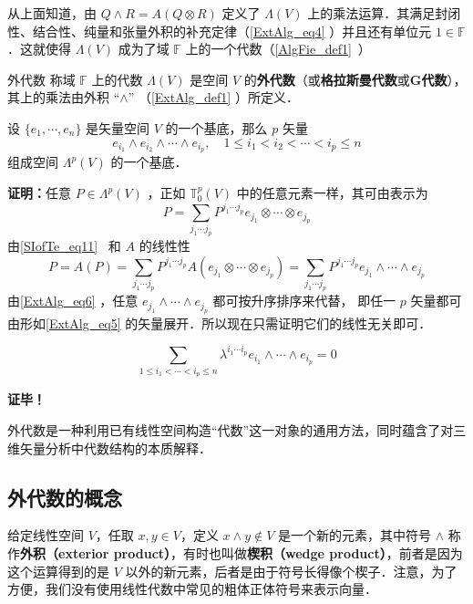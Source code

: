 从上面知道，由 $Q \wedge R=A(Q\otimes R)$ 定义了 $\Lambda(V)$ 上的乘法运算．其满足封闭性、结合性、纯量和张量外积的补充定律（\autoref{ExtAlg_eq4} ）并且还有单位元 $1\in\mathbb F$．这就使得 $\Lambda(V)$ 成为了域 $\mathbb F$ 上的一个代数（\autoref{AlgFie_def1}~）
\begin{definition}{外代数}
称域 $\mathbb F$ 上的代数 $\Lambda(V)$ 是空间 $V$ 的\textbf{外代数}（或\textbf{格拉斯曼代数}或\textbf{G代数}），其上的乘法由外积 “$\wedge$” （\autoref{ExtAlg_def1} ）所定义．
\end{definition}
\begin{theorem}{}
设 $\{e_1,\cdots,e_n\}$ 是矢量空间 $V$ 的一个基底，那么 $p$ 矢量
\begin{equation}\label{ExtAlg_eq5}
e_{i_1}\wedge e_{i_2}\wedge\cdots\wedge e_{i_p},\quad 1\leq i_1<i_2<\cdots<i_p\leq n
\end{equation}
组成空间 $\Lambda^p(V)$ 的一个基底．
\end{theorem}
\textbf{证明：}任意 $P\in\Lambda^p(V)$ ，正如 $\mathbb T_0^p(V)$ 中的任意元素一样，其可由表示为
\begin{equation}
P=\sum_{j_1\cdots j_p}P^{j_1\cdots j_p}e_{j_1}\otimes\cdots\otimes e_{j_p}
\end{equation}
由\autoref{SIofTe_eq11}~ 和 $A$ 的线性性
\begin{equation}
P=A(P)=\sum_{j_1\cdots j_p}P^{j_1\cdots j_p}A(e_{j_1}\otimes\cdots\otimes e_{j_p})=\sum_{j_1\cdots j_p}P^{j_1\cdots j_p}e_{j_1}\wedge\cdots\wedge e_{j_p}
\end{equation}
由\autoref{ExtAlg_eq6} ，任意 $e_{j_1}\wedge\cdots\wedge e_{j_p}$ 都可按升序排序来代替， 即任一 $p$ 矢量都可由形如\autoref{ExtAlg_eq5} 的矢量展开．所以现在只需证明它们的线性无关即可．


\begin{equation}
\sum_{1\leq i_1<\cdots<i_p\leq n} \lambda^{i_1\cdots i_p} e_{i_1}\wedge\cdots\wedge e_{i_p}=0
\end{equation}



\textbf{证毕！}



外代数是一种利用已有线性空间构造“代数”这一对象的通用方法，同时蕴含了对三维矢量分析中代数结构的本质解释．

\subsection{外代数的概念}

给定线性空间 $V$，任取 $x, y\in V$，定义 $x\wedge y\not\in V$ 是一个新的元素，其中符号 $\wedge$ 称作\textbf{外积（exterior product）}，有时也叫做\textbf{楔积（wedge product）}，前者是因为这个运算得到的是 $V$ 以外的新元素，后者是由于符号长得像个楔子．注意，为了方便，我们没有使用线性代数中常见的粗体正体符号来表示向量．

